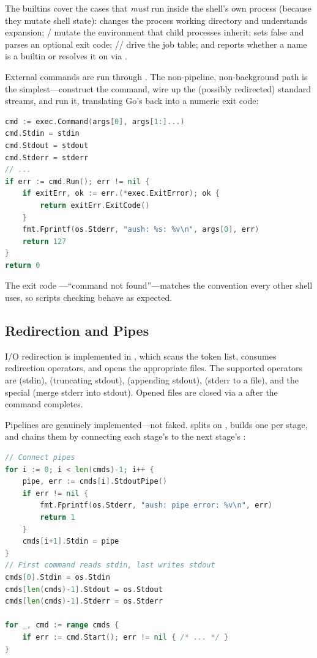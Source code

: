 The builtins cover the cases that \emph{must} run inside the shell's own process
(because they mutate shell state):  changes the process working
directory and understands \code{\~} expansion; / mutate
the environment that child processes inherit;  sets 
false and parses an optional exit code; // drive the
job table; and  reports whether a name is a builtin or resolves it on
 via .

External commands are run through . The non-pipeline,
non-background path is the simplest---construct the command, wire up the
(possibly redirected) standard streams, and run it, translating Go's
 back into a numeric exit code:

\begin{lstlisting}[language=Go, caption={Executing an external command (shell/shell.go)}]
cmd := exec.Command(args[0], args[1:]...)
cmd.Stdin = stdin
cmd.Stdout = stdout
cmd.Stderr = stderr
// ...
if err := cmd.Run(); err != nil {
    if exitErr, ok := err.(*exec.ExitError); ok {
        return exitErr.ExitCode()
    }
    fmt.Fprintf(os.Stderr, "aush: %s: %v\n", args[0], err)
    return 127
}
return 0
\end{lstlisting}

The exit code ---``command not found''---matches the convention every
other shell uses, so scripts checking  behave as expected.

\subsection{Redirection and Pipes}

I/O redirection is implemented in , which scans the token
list, consumes redirection operators, and opens the appropriate files. The
supported operators are \code{<} (stdin), \code{>} (truncating stdout),
\code{>>} (appending stdout),  (stderr to a file), and the special
 (merge stderr into stdout). Opened files are closed via a
 after the command completes.

Pipelines are genuinely implemented---not faked.  splits on
\code{|}, builds one  per stage, and chains them by connecting
each stage's  to the next stage's :

\begin{lstlisting}[language=Go, caption={Wiring a multi-stage pipeline (shell/shell.go)}]
// Connect pipes
for i := 0; i < len(cmds)-1; i++ {
    pipe, err := cmds[i].StdoutPipe()
    if err != nil {
        fmt.Fprintf(os.Stderr, "aush: pipe error: %v\n", err)
        return 1
    }
    cmds[i+1].Stdin = pipe
}
// First command reads stdin, last writes stdout
cmds[0].Stdin = os.Stdin
cmds[len(cmds)-1].Stdout = os.Stdout
cmds[len(cmds)-1].Stderr = os.Stderr

for _, cmd := range cmds {
    if err := cmd.Start(); err != nil { /* ... */ }
}
\end{lstlisting}

